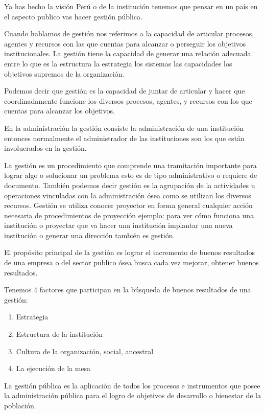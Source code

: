 \documentclass[
  a4paper,
]{article}
\providecommand{\tightlist}{%
  \setlength{\itemsep}{0pt}\setlength{\parskip}{0pt}}\usepackage{longtable,booktabs,array}
\begin{document}
Ya has hecho la visión Perú o de la institución tenemos que pensar en un
país en el aspecto publico vas hacer gestión pública.

Cuando hablamos de gestión nos referimos a la capacidad de articular
procesos, agentes y recursos con las que cuentas para alcanzar o
perseguir los objetivos institucionales. La gestión tiene la capacidad
de generar una relación adecuada entre lo que es la estructura la
estrategia los sistemas las capacidades los objetivos supremos de la
organización.

Podemos decir que gestión es la capacidad de juntar de articular y hacer
que coordinadamente funcione los diversos procesos, agentes, y recursos
con los que cuentas para alcanzar los objetivos.

En la administración la gestión consiste la administración de una
institución entonces normalmente el administrador de las instituciones
son los que están involucrados en la gestión.

La gestión es un procedimiento que comprende una tramitación importante
para lograr algo o solucionar un problema esto es de tipo administrativo
o requiere de documento. También podemos decir gestión es la agrupación
de la actividades u operaciones vinculadas con la administración ósea
como se utilizan los diversos recursos. Gestión se utiliza conocer
proyector en forma general cualquier acción necesaria de procedimientos
de proyección ejemplo: para ver cómo funciona una institución o
proyectar que va hacer una institución implantar una nueva institución o
generar una dirección también es gestión.

El propósito principal de la gestión es lograr el incremento de buenos
resultados de una empresa o del sector publico ósea busca cada vez
mejorar, obtener buenos resultados.

Tenemos 4 factores que participan en la búsqueda de buenos resultados de
una gestión:

\begin{enumerate}
\def\labelenumi{\arabic{enumi}.}
\tightlist
\item
  Estrategia
\item
  Estructura de la institución
\item
  Cultura de la organización, social, ancestral
\item
  La ejecución de la mesa
\end{enumerate}

La gestión pública es la aplicación de todos los procesos e instrumentos
que posee la administración pública para el logro de objetivos de
desarrollo o bienestar de la población.
\end{document}
